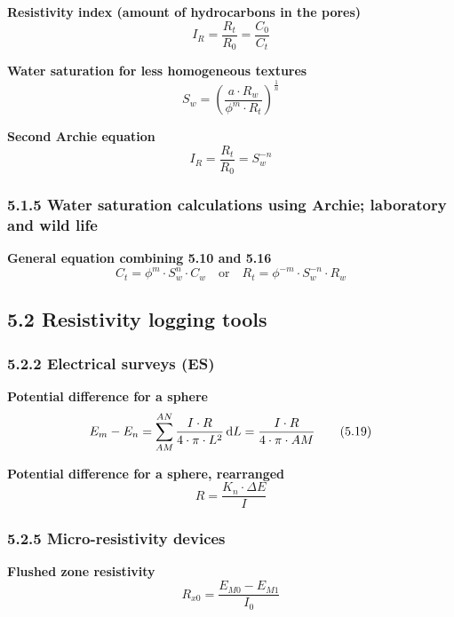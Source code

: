 \textbf{Resistivity index (amount of hydrocarbons in the pores)}
\begin{equation*}
    I_R = \frac{R_t}{R_0} = \frac{C_0}{C_t}\tag{5.15}
\end{equation*}

\textbf{Water saturation for less homogeneous textures}
\begin{equation*}
    S_w = \left( \frac{a\cdot R_w}{\phi^m\cdot R_t} \right)^\frac{1}{n}\tag{5.16}
\end{equation*}

\textbf{Second Archie equation}
\begin{equation*}
    I_R = \frac{R_t}{R_0} = S_w^{-n}\tag{5.17}
\end{equation*}

\subsubsection{5.1.5 Water saturation calculations using Archie; laboratory and wild life}
\textbf{General equation combining 5.10 and 5.16}
\begin{equation*}
    C_t = \phi^m\cdot S_w^n\cdot C_w\quad\mathrm{or}\quad R_t=\phi^{-m}\cdot S_w^{-n}\cdot R_w\tag{5.18}
\end{equation*}

\subsection{5.2 Resistivity logging tools}
\subsubsection{5.2.2 Electrical surveys (ES)}
\textbf{Potential difference for a sphere}
\begin{equation*}
    E_m - E_n = \sum_{AM}^{AN}\frac{I\cdot R}{4\cdot\pi\cdot L^2}\mathop{}\!\mathrm{d} L = \frac{I\cdot R}{4\cdot\pi\cdot AM}\tag{5.19}
\end{equation*}

\textbf{Potential difference for a sphere, rearranged}
\begin{equation*}
    R = \frac{K_n\cdot\Delta E}{I}\tag{5.20}
\end{equation*}

\subsubsection{5.2.5 Micro-resistivity devices}
\textbf{Flushed zone resistivity}
\begin{equation*}
    R_{x0} = \frac{E_{M0} - E_{M1}}{I_0}\tag{5.21}
\end{equation*}

